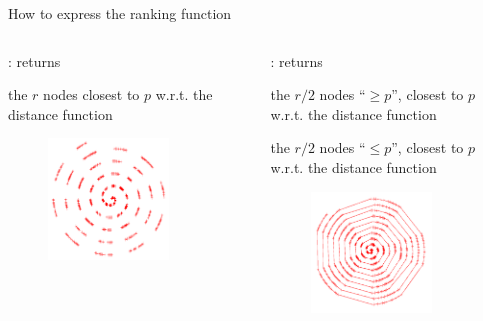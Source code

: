 \begin{frame}{How to express the ranking function}

\begin{columns}
\begin{column}{0.50\textwidth}
: returns
\BI
\item the $r$ nodes closest to $p$ w.r.t. the distance function
\EI
\begin{figure}
	\includegraphics[width=0.75\textwidth]{unsorted-line}
\end{figure}
\end{column}
\begin{column}{0.50\textwidth}
: returns
\BI
\item the $r/2$ nodes “$\geq p$”, closest to $p$ w.r.t. the distance function
\item the $r/2$ nodes “$\leq p$”, closest to $p$ w.r.t. the distance function
\EI

\begin{figure}
	\includegraphics[width=0.75\textwidth]{sorted-line}
\end{figure}


\end{column}
\end{columns}
\end{frame}
